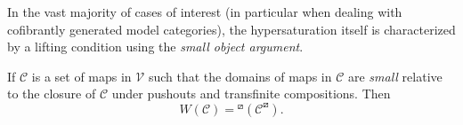 \documentclass[a4paper,10pt,draft]{article}%
\begin{document}
In the vast majority of cases of interest
(in particular when dealing with cofibrantly generated model categories),
the hypersaturation itself is characterized by a lifting condition using the \textit{small object argument}.

\begin{lemma}
      If $\mathcal C$ is a set of maps in $\mathcal V$ such that
      the domains of maps in $\mathcal C$ are \textit{small} relative to
      the closure of $\mathcal C$ under pushouts and transfinite compositions.
      Then
      \begin{equation}
            W(\mathcal C) = {}^\boxslash(\mathcal C^{\boxslash}).
      \end{equation}
\end{lemma}
\end{document}
